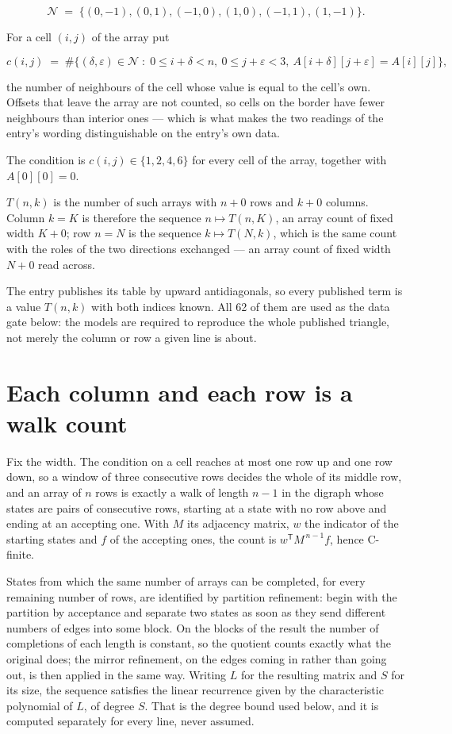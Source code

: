 \documentclass[11pt]{article}
\theoremstyle{definition}
\begin{document}
\[\mathcal{N} \;=\; \{(0,-1), (0,1), (-1,0), (1,0), (-1,1), (1,-1)\}.\]

For a cell $(i,j)$ of the array put

\[c(i,j) \;=\; \#\bigl\{(\delta,\varepsilon)\in\mathcal{N} \;:\; 0\le i+\delta<n,\ 0\le j+\varepsilon<3,\ A[i+\delta][j+\varepsilon] = A[i][j]\bigr\},\]

the number of neighbours of the cell whose value is equal to the cell's own. Offsets that leave the array are not counted, so cells on the border have fewer neighbours than interior ones --- which is what makes the two readings of the entry's wording distinguishable on the entry's own data.

The condition is $c(i,j) \in \{1, 2, 4, 6\}$ for every cell of the array, together with $A[0][0]=0$.

$T(n,k)$ is the number of such arrays with $n + 0$ rows and $k + 0$ columns. Column $k = K$ is therefore the sequence $n \mapsto T(n,K)$, an array count of fixed width $K + 0$; row $n = N$ is the sequence $k \mapsto T(N,k)$, which is the same count with the roles of the two directions exchanged --- an array count of fixed width $N + 0$ read across.

The entry publishes its table by upward antidiagonals, so every published term is a value $T(n,k)$ with both indices known. All 62 of them are used as the data gate below: the models are required to reproduce the whole published triangle, not merely the column or row a given line is about.

\section{Each column and each row is a walk count}

Fix the width. The condition on a cell reaches at most one row up and one row down, so a window of three consecutive rows decides the whole of its middle row, and an array of $n$ rows is exactly a walk of length $n-1$ in the digraph whose states are pairs of consecutive rows, starting at a state with no row above and ending at an accepting one. With $M$ its adjacency matrix, $w$ the indicator of the starting states and $f$ of the accepting ones, the count is $w^{\mathsf T}M^{\,n-1}f$, hence C-finite.

States from which the same number of arrays can be completed, for every remaining number of rows, are identified by partition refinement: begin with the partition by acceptance and separate two states as soon as they send different numbers of edges into some block. On the blocks of the result the number of completions of each length is constant, so the quotient counts exactly what the original does; the mirror refinement, on the edges coming in rather than going out, is then applied in the same way. Writing $L$ for the resulting matrix and $S$ for its size, the sequence satisfies the linear recurrence given by the characteristic polynomial of $L$, of degree $S$. That is the degree bound used below, and it is computed separately for every line, never assumed.
\end{document}
